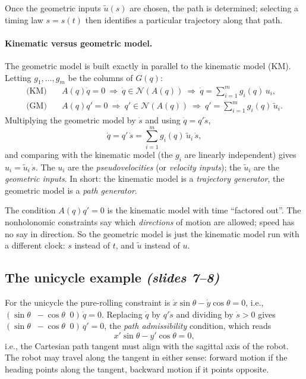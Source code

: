 \documentclass[11pt,a4paper]{article}
\def\boldsymbol#1{#1}%
\newcommand{\Null}{\mathcal{N}}
\newcommand{\q}{\boldsymbol{q}}
\newcommand{\ut}{\tilde{\boldsymbol{u}}}
\theoremstyle{definition}
\theoremstyle{plain}
\theoremstyle{remark}
\begin{document}
Once the geometric inputs $\ut(s)$ are chosen, the path is determined; selecting a timing law $s=s(t)$ then identifies a
particular trajectory along that path.

\paragraph{Kinematic versus geometric model.} The geometric model is built exactly in parallel to the kinematic model (KM).
Letting $\boldsymbol g_1,\dots,\boldsymbol g_m$ be the columns of $G(\q)$:
\begin{align}
\text{(KM)}\quad & A(\q)\dot\q=0\ \Rightarrow\ \dot\q\in\Null(A(\q))\ \Rightarrow\ \dot\q=\sum_{i=1}^m\boldsymbol g_i(\q)\,u_i,\\
\text{(GM)}\quad & A(\q)\q'=0\ \Rightarrow\ \q'\in\Null(A(\q))\ \Rightarrow\ \q'=\sum_{i=1}^m\boldsymbol g_i(\q)\,\tilde u_i .
\end{align}
Multiplying the geometric model by $\dot s$ and using $\dot\q=\q'\dot s$,
\[
\dot\q=\q'\,\dot s=\sum_{i=1}^m\boldsymbol g_i(\q)\,\tilde u_i\,\dot s ,
\]
and comparing with the kinematic model (the $\boldsymbol g_i$ are linearly independent) gives $u_i=\tilde u_i\,\dot s$. The $u_i$ are the
\emph{pseudovelocities} (or \emph{velocity inputs}); the $\tilde u_i$ are the \emph{geometric inputs}. In short: the kinematic model is a
\emph{trajectory generator}, the geometric model is a \emph{path generator}.


\begin{intuition}
The condition $A(\q)\q'=0$ is the kinematic model with time ``factored out''. The nonholonomic constraints say
which \emph{directions} of motion are allowed; speed has no say in direction. So the geometric model is just the
kinematic model run with a different clock: $s$ instead of $t$, and $\ut$ instead of $\boldsymbol u$.
\end{intuition}

\subsection{The unicycle example \emph{(slides 7--8)}}

For the unicycle the pure-rolling constraint is $\dot x\sin\theta-\dot y\cos\theta=0$, i.e., $(\sin\theta\;\;-\cos\theta\;\;0)\,\dot\q=0$. Replacing $\dot\q$ by $\q'\dot s$ and dividing by $\dot s>0$ gives $(\sin\theta\;\;-\cos\theta\;\;0)\,\q'=0$, the \emph{path admissibility} condition, which reads
\begin{equation}
x'\sin\theta-y'\cos\theta=0,
\end{equation}
i.e., the Cartesian path tangent must align with the sagittal axis of the robot. The robot may travel along the tangent in
either sense: forward motion if the heading points along the tangent, backward motion if it points opposite.
\end{document}
